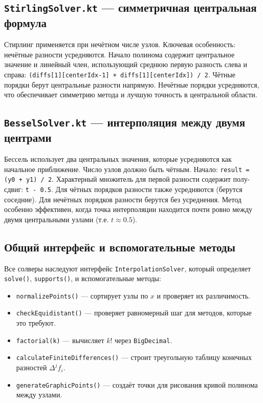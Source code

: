 \documentclass[12pt,a4paper]{article}
\begin{document}
\subsection{\texttt{StirlingSolver.kt} --- симметричная центральная формула}

Стирлинг применяется при нечётном числе узлов. Ключевая особенность: нечётные разности усредняются. Начало полинома содержит центральное значение и линейный член, использующий среднюю первую разность слева и справа: \texttt{(diffs[1][centerIdx-1] + diffs[1][centerIdx]) / 2}. Чётные порядки берут центральные разности напрямую. Нечётные порядки усредняются, что обеспечивает симметрию метода и лучшую точность в центральной области.

\subsection{\texttt{BesselSolver.kt} --- интерполяция между двумя центрами}

Бессель использует два центральных значения, которые усредняются как начальное приближение. Число узлов должно быть чётным. Начало: \texttt{result = (y0 + y1) / 2}. Характерный множитель для первой разности содержит полу-сдвиг: \texttt{t - 0.5}. Для чётных порядков разности также усредняются (берутся соседние). Для нечётных порядков разности берутся без усреднения. Метод особенно эффективен, когда точка интерполяции находится почти ровно между двумя центральными узлами (т.е. $t \approx 0.5$).

\subsection{Общий интерфейс и вспомогательные методы}

Все солверы наследуют интерфейс \texttt{InterpolationSolver}, который определяет \texttt{solve()}, \texttt{supports()}, и вспомогательные методы:
\begin{itemize}
\item \texttt{normalizePoints()} --- сортирует узлы по $x$ и проверяет их различимость.
\item \texttt{checkEquidistant()} --- проверяет равномерный шаг для методов, которые это требуют.
\item \texttt{factorial(k)} --- вычисляет $k!$ через \texttt{BigDecimal}.
\item \texttt{calculateFiniteDifferences()} --- строит треугольную таблицу конечных разностей $\Delta^j f_i$.
\item \texttt{generateGraphicPoints()} --- создаёт точки для рисования кривой полинома между узлами.
\end{itemize}
\end{document}
